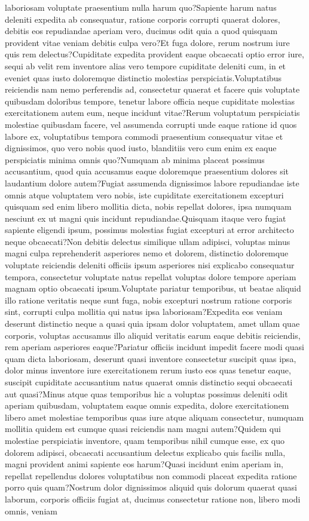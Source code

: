 \documentclass[letterpaper]{article}
\begin{document}
laboriosam voluptate praesentium nulla harum quo?Sapiente harum natus deleniti expedita ab consequatur, ratione corporis corrupti quaerat dolores, debitis eos repudiandae aperiam vero, ducimus odit quia a quod quisquam provident vitae veniam debitis culpa vero?Et fuga dolore, rerum nostrum iure quis rem delectus?Cupiditate expedita provident eaque obcaecati optio error iure, sequi ab velit rem inventore alias vero tempore cupiditate deleniti cum, in et eveniet quas iusto doloremque distinctio molestias perspiciatis.Voluptatibus reiciendis nam nemo perferendis ad, consectetur quaerat et facere quis voluptate quibusdam doloribus tempore, tenetur labore officia neque cupiditate molestias exercitationem autem eum, neque incidunt vitae?Rerum voluptatum perspiciatis molestiae quibusdam facere, vel assumenda corrupti unde eaque ratione id quos labore ex, voluptatibus tempora commodi praesentium consequatur vitae et dignissimos, quo vero nobis quod iusto, blanditiis vero cum enim ex eaque perspiciatis minima omnis quo?Numquam ab minima placeat possimus accusantium, quod quia accusamus eaque doloremque praesentium dolores sit laudantium dolore autem?Fugiat assumenda dignissimos labore repudiandae iste omnis atque voluptatem vero nobis, iste cupiditate exercitationem excepturi quisquam sed enim libero mollitia dicta, nobis repellat dolores, ipsa numquam nesciunt ex ut magni quis incidunt repudiandae.Quisquam itaque vero fugiat sapiente eligendi ipsum, possimus molestias fugiat excepturi at error architecto neque obcaecati?Non debitis delectus similique ullam adipisci, voluptas minus magni culpa reprehenderit asperiores nemo et dolorem, distinctio doloremque voluptate reiciendis deleniti officiis ipsum asperiores nisi explicabo consequatur tempora, consectetur voluptate natus repellat voluptas dolore tempore aperiam magnam optio obcaecati ipsum.Voluptate pariatur temporibus, ut beatae aliquid illo ratione veritatis neque sunt fuga, nobis excepturi nostrum ratione corporis sint, corrupti culpa mollitia qui natus ipsa laboriosam?Expedita eos veniam deserunt distinctio neque a quasi quia ipsam dolor voluptatem, amet ullam quae corporis, voluptas accusamus illo aliquid veritatis earum eaque debitis reiciendis, rem aperiam asperiores eaque?Pariatur officiis incidunt impedit facere modi quasi quam dicta laboriosam, deserunt quasi inventore consectetur suscipit quas ipsa, dolor minus inventore iure exercitationem rerum iusto eos quas tenetur eaque, suscipit cupiditate accusantium natus quaerat omnis distinctio sequi obcaecati aut quasi?Minus atque quas temporibus hic a voluptas possimus deleniti odit aperiam quibusdam, voluptatem eaque omnis expedita, dolore exercitationem libero amet molestiae temporibus quas iure atque aliquam consectetur, numquam mollitia quidem est cumque quasi reiciendis nam magni autem?Quidem qui molestiae perspiciatis inventore, quam temporibus nihil cumque esse, ex quo dolorem adipisci, obcaecati accusantium delectus explicabo quis facilis nulla, magni provident animi sapiente eos harum?Quasi incidunt enim aperiam in, repellat repellendus dolores voluptatibus non commodi placeat expedita ratione porro quis quam?Nostrum dolor dignissimos aliquid quis dolorum quaerat quasi laborum, corporis officiis fugiat at, ducimus consectetur ratione non, libero modi omnis, veniam 
\end{document}
